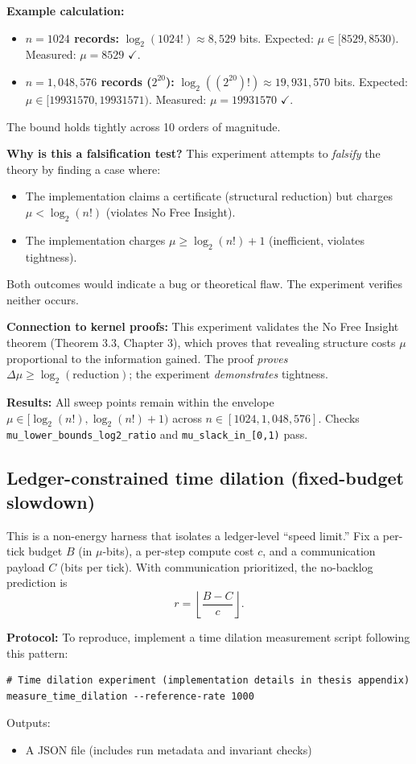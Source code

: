 \textbf{Example calculation:}
\begin{itemize}
    \item \textbf{$n = 1024$ records:} $\log_2(1024!) \approx 8,529$ bits. Expected: $\mu \in [8529, 8530)$. Measured: $\mu = 8529$ $\checkmark$.
    \item \textbf{$n = 1,048,576$ records ($2^{20}$):} $\log_2((2^{20})!) \approx 19,931,570$ bits. Expected: $\mu \in [19931570, 19931571)$. Measured: $\mu = 19931570$ $\checkmark$.
\end{itemize}
The bound holds tightly across 10 orders of magnitude.

\textbf{Why is this a falsification test?} This experiment attempts to \textit{falsify} the theory by finding a case where:
\begin{itemize}
    \item The implementation claims a certificate (structural reduction) but charges $\mu < \log_2(n!)$ (violates No Free Insight).
    \item The implementation charges $\mu \geq \log_2(n!) + 1$ (inefficient, violates tightness).
\end{itemize}
Both outcomes would indicate a bug or theoretical flaw. The experiment verifies neither occurs.

\textbf{Connection to kernel proofs:} This experiment validates the No Free Insight theorem (Theorem 3.3, Chapter 3), which proves that revealing structure costs $\mu$ proportional to the information gained. The proof \textit{proves} $\Delta\mu \geq \log_2(\text{reduction})$; the experiment \textit{demonstrates} tightness.


\textbf{Results:} All sweep points remain within the envelope $\mu \in [\log_2(n!), \log_2(n!)+1)$ across $n \in [1024, 1,048,576]$. Checks \texttt{mu\_lower\_bounds\_log2\_ratio} and \texttt{mu\_slack\_in\_[0,1)} pass.

\subsection{Ledger-constrained time dilation (fixed-budget slowdown)}
This is a non-energy harness that isolates a ledger-level ``speed limit.'' Fix a per-tick budget $B$ (in $\mu$-bits), a per-step compute cost $c$, and a communication payload $C$ (bits per tick). With communication prioritized, the no-backlog prediction is
\[
r = \left\lfloor\frac{B-C}{c}\right\rfloor.
\]

\textbf{Protocol:}
To reproduce, implement a time dilation measurement script following this pattern:
\begin{lstlisting}
# Time dilation experiment (implementation details in thesis appendix)
measure_time_dilation --reference-rate 1000
\end{lstlisting}
Outputs:
\begin{itemize}
    \item A JSON file (includes run metadata and invariant checks)
\end{itemize}

